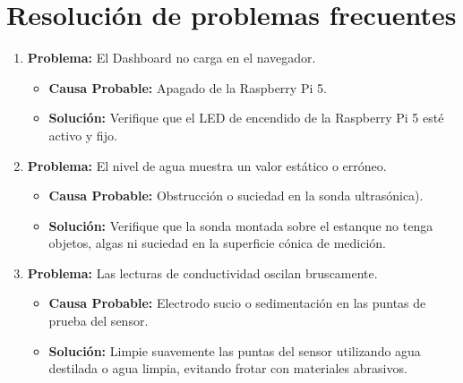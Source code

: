 \documentclass[12pt,letterpaper]{article}     %
\begin{document}
\section{Resolución de problemas frecuentes}
\begin{enumerate}
 


            \item \textbf{Problema:} El Dashboard no carga en el navegador.
            \begin{itemize}
                \item \textbf{Causa Probable:} Apagado de la Raspberry Pi 5.
                \item \textbf{Solución:} Verifique que el LED de encendido de la Raspberry Pi 5 esté activo y fijo.
                
            \end{itemize}
            
            \vspace{0.5cm}
            
            \item \textbf{Problema:} El nivel de agua muestra un valor estático o erróneo.
            \begin{itemize}
                \item \textbf{Causa Probable:} Obstrucción o suciedad en la sonda ultrasónica).
                \item \textbf{Solución:} Verifique que la sonda montada sobre el estanque no tenga objetos, algas ni suciedad en la superficie cónica de medición.
            \end{itemize}
            
            \vspace{0.5cm}
            
            \item \textbf{Problema:} Las lecturas de conductividad oscilan bruscamente.
            \begin{itemize}
                \item \textbf{Causa Probable:} Electrodo sucio o sedimentación en las puntas de prueba del sensor.
                \item \textbf{Solución:} Limpie suavemente las puntas del sensor utilizando agua destilada o agua limpia, evitando frotar con materiales abrasivos.
            \end{itemize}
            
            \vspace{0.5cm}
            

\end{enumerate}
\end{document}
